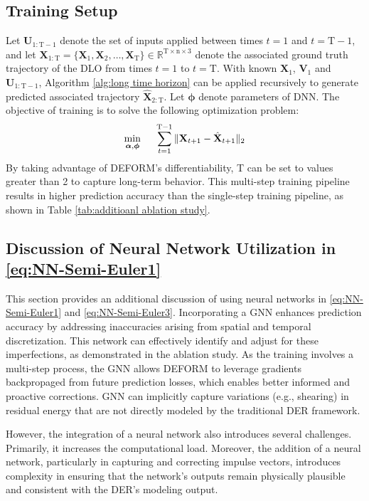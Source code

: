 \subsection{Training Setup}
\label{Training Details}
Let $\textbf{U}_{1:\text{T}-1}$ denote the set of inputs applied between times $t=1$ and $t=\text{T}-1$, and let $\textbf{X}_{1:\text{T}} =\{\textbf{X}_1, \textbf{X}_2,\ldots, \textbf{X}_\text{T}\} \in \mathbb{R}^{\text{T} \times \text{n}\times 3}$ denote the associated ground truth trajectory of the DLO from times $t=1$ to $t=\text{T}$. With known $\textbf{X}_1$, $\textbf{V}_1$ and $\textbf{U}_{1:\text{T}-1}$, Algorithm \ref{alg:long time horizon} can be applied recursively to generate predicted associated trajectory $\hat{\textbf{X}}_{2:\text{T}}$. Let $\bm{\phi}$ denote parameters of DNN. The objective of training is to solve the following optimization problem: 
\begin{equation}
    \label{eq:trainingcost}
    \underset{\bm{\alpha}, \bm{\phi}}{\min} \hspace{0.5cm} \sum_{t=1}^{\text{T}-1} \|\textbf{X}_{t+1}- \hat{\textbf{X}}_{t+1}\|_2  
\end{equation}
By taking advantage of DEFORM's differentiability, T can be set to values greater than 2 to capture long-term behavior. 
This multi-step training pipeline results in higher prediction accuracy than the single-step training pipeline, as shown in Table \ref{tab:additioanl ablation study}.

\subsection{Discussion of Neural Network Utilization in \eqref{eq:NN-Semi-Euler1}}
\label{appendix:NN discussion}
This section provides an additional discussion of using neural networks in \eqref{eq:NN-Semi-Euler1} and \eqref{eq:NN-Semi-Euler3}.
Incorporating a GNN enhances prediction accuracy by addressing inaccuracies arising from spatial and temporal discretization. 
This network can effectively identify and adjust for these imperfections, as demonstrated in the ablation study.
As the training involves a multi-step process, the GNN allows DEFORM to leverage gradients backpropaged from future prediction losses, which enables better informed and proactive corrections.
GNN can implicitly capture variations (e.g., shearing) in residual energy that are not directly modeled by the traditional DER framework.

However, the integration of a neural network also introduces several challenges. Primarily, it increases the computational load. 
Moreover, the addition of a neural network, particularly in capturing and correcting impulse vectors, introduces complexity in ensuring that the network's outputs remain physically plausible and consistent with the DER's modeling output. 

